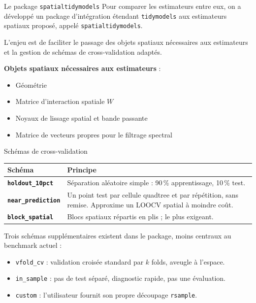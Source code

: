 \documentclass[aspectratio=169,11pt]{beamer}
\begin{document}
\begin{frame}{Le package \texttt{spatialtidymodels}}
\small
Pour comparer les estimateurs entre eux, on a développé un package
d'intégration étendant \texttt{tidymodels} aux estimateurs spatiaux
proposé, appelé \texttt{spatialtidymodels}.
\vspace{0.2cm}

L'enjeu est de faciliter le passage des objets spatiaux nécessaires aux
estimateurs et la gestion de schémas de cross-validation adaptés.
\vspace{0.25cm}

\textbf{Objets spatiaux nécessaires aux estimateurs} :
\begin{itemize}
    \item Géométrie
    \item Matrice d'interaction spatiale $W$
    \item Noyaux de lissage spatial et bande passante
    \item Matrice de vecteurs propres pour le filtrage spectral
\end{itemize}
\end{frame}

\begin{frame}{Schémas de cross-validation}
\small
\begin{tabularx}{\textwidth}{>{\bfseries\RaggedRight\arraybackslash}p{} X}
\toprule
Schéma & Principe \\
\midrule
\texttt{holdout\_10pct} & Séparation aléatoire simple : 90\,\% apprentissage, 10\,\% test. \\
\addlinespace
\texttt{near\_prediction} & Un point test par cellule quadtree et par répétition, sans remise. Approxime un LOOCV spatial à moindre coût. \\
\addlinespace
\texttt{block\_spatial} & Blocs spatiaux répartis en plis ; le plus exigeant. \\
\bottomrule
\end{tabularx}
\vspace{0.3cm}
Trois schémas supplémentaires existent dans le package, moins centraux au
benchmark actuel :
\begin{itemize}
    \item \texttt{vfold\_cv} : validation croisée standard par $k$ folds, aveugle à l'espace.
    \item \texttt{in\_sample} : pas de test séparé, diagnostic rapide, pas une évaluation.
    \item \texttt{custom} : l'utilisateur fournit son propre découpage \texttt{rsample}.
\end{itemize}
\end{frame}
\end{document}
